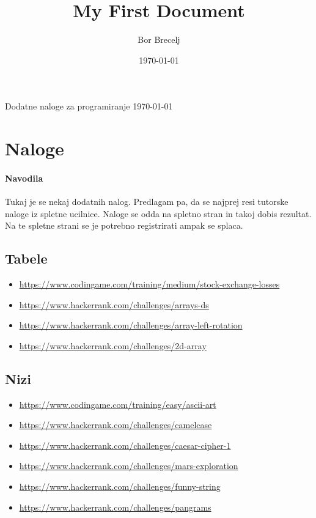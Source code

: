 \documentclass{article}
\title{My First Document}
\date{\today}
\author{Bor Brecelj}
\begin{document}
	\begin{center}
		{\Huge Dodatne naloge za programiranje}
		\today
	\end{center}
	\pagebreak

	\tableofcontents
	\pagebreak

	\section{Naloge}
		\paragraph{Navodila} Tukaj je se nekaj dodatnih nalog. Predlagam pa, da se najprej resi tutorske naloge iz spletne ucilnice. Naloge se odda na spletno stran in takoj dobis rezultat. Na te spletne strani se je potrebno registrirati ampak se splaca.

		\subsection{Tabele}
			\begin{itemize}
				\item \url{https://www.codingame.com/training/medium/stock-exchange-losses}
				\item \url{https://www.hackerrank.com/challenges/arrays-ds}
				\item \url{https://www.hackerrank.com/challenges/array-left-rotation}
				\item \url{https://www.hackerrank.com/challenges/2d-array}
			\end{itemize}

		\subsection{Nizi}
			\begin{itemize}
				\item \url{https://www.codingame.com/training/easy/ascii-art}
				\item \url{https://www.hackerrank.com/challenges/camelcase}
				\item \url{https://www.hackerrank.com/challenges/caesar-cipher-1}
				\item \url{https://www.hackerrank.com/challenges/mars-exploration}
				\item \url{https://www.hackerrank.com/challenges/funny-string}
				\item \url{https://www.hackerrank.com/challenges/pangrams}
			\end{itemize}
\end{document}
